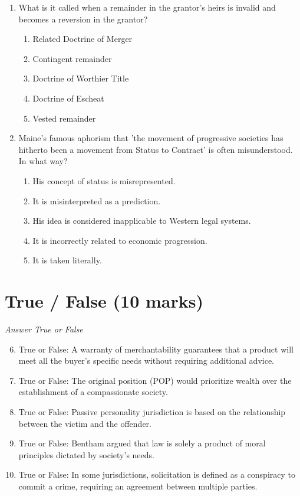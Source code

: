 \documentclass[12pt]{article}
\begin{document}
\begin{enumerate}[label=\arabic*.]
\begin{enumerate}[label=(\alph*)]
    \item Treaties create obligations for third States without their consent
\end{enumerate}
\item What is it called when a remainder in the grantor's heirs is invalid and becomes a reversion in the grantor?
\begin{enumerate}[label=(\alph*)]
    \item Related Doctrine of Merger
    \item Contingent remainder
    \item Doctrine of Worthier Title
    \item Doctrine of Escheat
    \item Vested remainder
\end{enumerate}
\item Maine's famous aphorism that 'the movement of progressive societies has hitherto been a movement from Status to Contract' is often misunderstood. In what way?
\begin{enumerate}[label=(\alph*)]
    \item His concept of status is misrepresented.
    \item It is misinterpreted as a prediction.
    \item His idea is considered inapplicable to Western legal systems.
    \item It is incorrectly related to economic progression.
    \item It is taken literally.
\end{enumerate}
\end{enumerate}

\section*{True / False (10 marks)}
\textit{Answer True or False}
\begin{enumerate}[label=\arabic*.]
\setcounter{enumi}{5}
\item True or False: A warranty of merchantability guarantees that a product will meet all the buyer's specific needs without requiring additional advice.
\item True or False: The original position (POP) would prioritize wealth over the establishment of a compassionate society.
\item True or False: Passive personality jurisdiction is based on the relationship between the victim and the offender.
\item True or False: Bentham argued that law is solely a product of moral principles dictated by society's needs.
\item True or False: In some jurisdictions, solicitation is defined as a conspiracy to commit a crime, requiring an agreement between multiple parties.
\end{enumerate}
\end{document}
